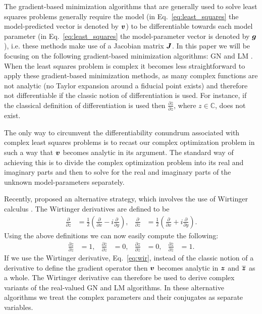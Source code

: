 \documentclass[useAMS,usenatbib]{mn2e}
\newcommand{\bz}{\bmath{z}}
\newcommand{\bg}{\bmath{g}}
\newcommand{\bv}{\bmath{v}}
\newcommand{\bJ}{\bmath{J}}
\newcommand{\conj}[1]{\overline{#1}}
\begin{document}
The gradient-based minimization algorithms that are generally used to solve least squares problems generally require the model (in Eq.~\eqref{eq:least_squares} the model-predicted vector is denoted by $\bv$) to be differentiable
towards each model parameter (in Eq.~\eqref{eq:least_squares} the model-parameter vector is denoted by $\bg$), i.e. these methods make use of a Jacobian matrix $\bJ$. In this paper we will be focusing on the following gradient-based minimization algorithms: GN and LM \citep{Levenberg1944,Marquardt1963}.
When the least squares problem is complex it becomes less straightforward to apply these gradient-based minimization methods, as
many complex functions are not analytic (no Taylor expansion around a fiducial point exists) and therefore not differentiable if the classic notion of differentiation is used. For instance, if the 
classical definition of differentiation is used then $\frac{\partial \conj{z}}{\partial z}$, where $z \in \mathbb{C}$, does not exist.

The only way to circumvent the differentiability conundrum associated with complex least squares problems is to recast our complex optimization problem in such a way that $\bv$ becomes analytic in its argument.
The standard way of achieving this is to divide the complex optimization problem into its real and imaginary parts and then to solve for the real and imaginary parts of the unknown model-parameters separately.

Recently, \citet{Sorber2012} proposed an alternative strategy, which involves the use of Wirtinger calculus \citep{Wirtinger1927}. The Wirtinger derivatives 
are defined to be 
\begin{align}
\label{eq:wir}
\frac{\partial}{\partial z} &= \frac{1}{2}\left ( \frac{\partial}{\partial x} -  i \frac{\partial}{\partial y} \right ),&\frac{\partial}{\partial \conj{z}} &= \frac{1}{2}\left ( \frac{\partial}{\partial x} +  i \frac{\partial}{\partial y} \right ). 
\end{align}
Using the above definitions we can now easily compute the following:
\begin{align}
\frac{\partial z}{\partial z} & = 1, & \frac{\partial \conj{z}}{\partial z}&=0, & \frac{\partial z}{\partial \conj{z}} & = 0, & \frac{\partial \conj{z}}{\partial \conj{z}}&=1.
\end{align}
If we use the Wirtinger derivative, Eq.~\eqref{eq:wir}, instead of the classic notion of a derivative to define the gradient operator then 
$\bv$ becomes analytic in $\bz$ and $\conj{\bz}$ as a whole. The Wirtinger derivative can therefore be used to derive complex variants of the real-valued GN and LM algorithms. In these alternative algorithms we treat the complex parameters and their conjugates as separate variables. 
\end{document}
